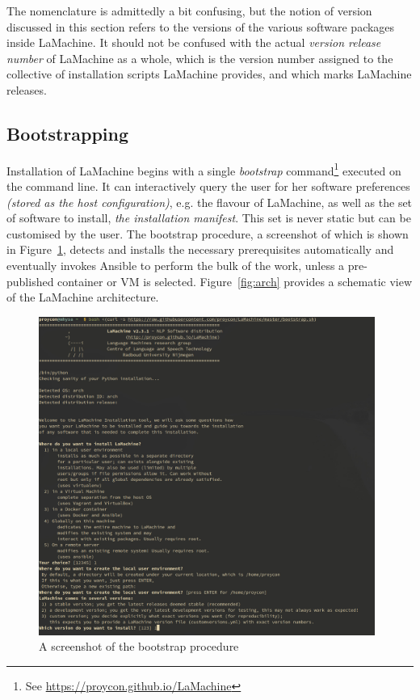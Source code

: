 \documentclass[a4paper,11pt]{article}
\begin{document}
The nomenclature is admittedly a bit confusing, but the notion of version discussed in this section refers to the
versions of the various software packages inside LaMachine. It should not be
confused with the actual \emph{version release number} of LaMachine as a whole, which is the version number assigned to
the collective of installation scripts LaMachine provides, and which marks LaMachine releases.

\subsection{Bootstrapping}

Installation of LaMachine begins with a single \emph{bootstrap} command\footnote{See \url{https://proycon.github.io/LaMachine}}
executed on the command line.  It can interactively query the user for her software preferences \emph{(stored as the
host configuration)}, e.g. the flavour of LaMachine, as well as the set of software to install, \emph{the installation
manifest}. This set is never static but can be customised by the user. The bootstrap procedure, a screenshot of which is shown in
Figure~\ref{fig:bootstrap}, detects and installs the
necessary prerequisites automatically and eventually invokes Ansible to perform the bulk of the work, unless a
pre-published container or VM is selected.  Figure~\ref{fig:arch} provides a schematic view of the LaMachine
architecture.

\begin{figure}[htb] \begin{center}
\includegraphics[width=110.0mm]{screenshot_bootstrap.jpg}
\end{center}
\caption{\footnotesize{A screenshot of the bootstrap procedure}}
\label{fig:bootstrap}
\end{figure}
\end{document}
